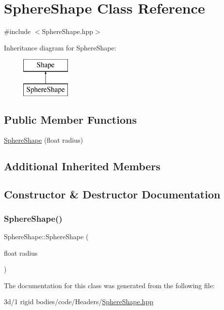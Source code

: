 \hypertarget{class_sphere_shape}{}\section{Sphere\+Shape Class Reference}
\label{class_sphere_shape}


{\ttfamily \#include $<$Sphere\+Shape.\+hpp$>$}

Inheritance diagram for Sphere\+Shape\+:\begin{figure}[H]
\begin{center}
\leavevmode
\includegraphics[height=2.000000cm]{class_sphere_shape}
\end{center}
\end{figure}
\subsection*{Public Member Functions}
\begin{DoxyCompactItemize}
\item 
\mbox{\hyperlink{class_sphere_shape_a4bba1b6e5fffae3e581aca4bb8d29d59}{Sphere\+Shape}} (float radius)
\end{DoxyCompactItemize}
\subsection*{Additional Inherited Members}


\subsection{Constructor \& Destructor Documentation}
\mbox{\label{class_sphere_shape_a4bba1b6e5fffae3e581aca4bb8d29d59}} 
\subsubsection{\texorpdfstring{Sphere\+Shape()}{SphereShape()}}
{\footnotesize\ttfamily Sphere\+Shape\+::\+Sphere\+Shape (\begin{DoxyParamCaption}\item[{float}]{radius }\end{DoxyParamCaption})\hspace{0.3cm}{\ttfamily [inline]}}



The documentation for this class was generated from the following file\+:\begin{DoxyCompactItemize}
\item 
3d/1 rigid bodies/code/\+Headers/\mbox{\hyperlink{_sphere_shape_8hpp}{Sphere\+Shape.\+hpp}}\end{DoxyCompactItemize}

